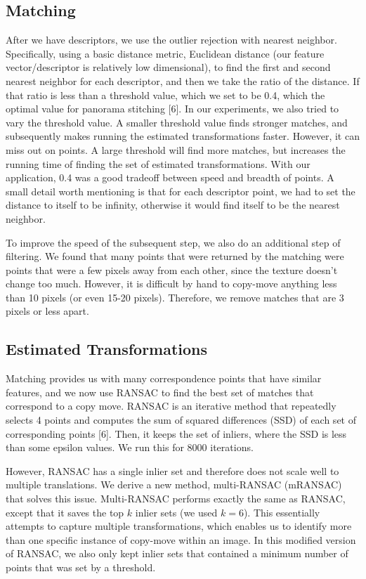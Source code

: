 \documentclass[12pt]{article}
\begin{document}
\subsection*{Matching}
After we have descriptors, we use the outlier rejection with nearest neighbor. Specifically, using a basic distance metric, Euclidean distance (our feature vector/descriptor is relatively low dimensional), to find the first and second nearest neighbor for each descriptor, and then we take the ratio of the distance. If that ratio is less than a threshold value, which we set to be 0.4, which the optimal value for panorama stitching [6]. In our experiments, we also tried to vary the threshold value. A smaller threshold value finds stronger matches, and subsequently makes running the estimated transformations faster. However, it can miss out on points. A large threshold will find more matches, but increases the running time of finding the set of estimated transformations. With our application, 0.4 was a good tradeoff between speed and breadth of points. A small detail worth mentioning is that for each descriptor point, we had to set the distance to itself to be infinity, otherwise it would find itself to be the nearest neighbor. 

To improve the speed of the subsequent step, we also do an additional step of filtering. We found that many points that were returned by the matching were points that were a few pixels away from each other, since the texture doesn't change too much. However, it is difficult by hand to copy-move anything less than 10 pixels (or even 15-20 pixels). Therefore, we remove matches that are 3 pixels or less apart. 

\subsection*{Estimated Transformations}
Matching provides us with many correspondence points that have similar features, and we now use RANSAC to find the best set of matches that correspond to a copy move. RANSAC is an iterative method that repeatedly selects 4 points and computes the sum of squared differences (SSD) of each set of corresponding points [6]. Then, it keeps the set of inliers, where the SSD is less than some epsilon values. We run this for 8000 iterations. 

However, RANSAC has a single inlier set and therefore does not scale well to multiple translations. We derive a new method, multi-RANSAC (mRANSAC) that solves this issue. Multi-RANSAC performs exactly the same as RANSAC, except that it saves the top $k$ inlier sets (we used $k = 6$). This essentially attempts to capture multiple transformations, which enables us to identify more than one specific instance of copy-move within an image. In this modified version of RANSAC, we also only kept inlier sets that contained a minimum number of points that was set by a threshold.
\end{document}
